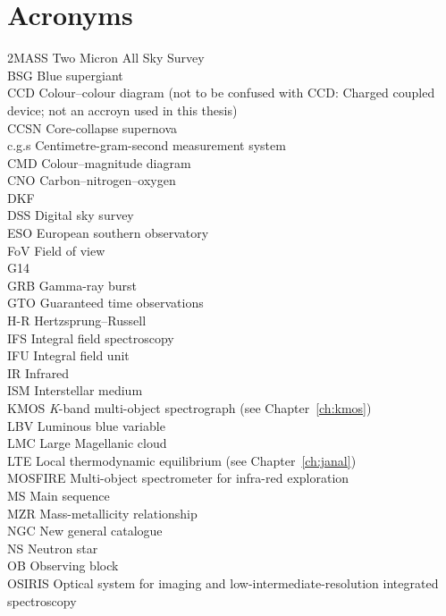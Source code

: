 \chapter{Acronyms}\label{ch:acc}

2MASS Two Micron All Sky Survey\\
BSG Blue supergiant\\
CCD Colour--colour diagram (not to be confused with CCD: Charged coupled device; not an accroyn used in this thesis)\\
CCSN Core-collapse supernova\\
c.g.s Centimetre-gram-second measurement system\\
CMD Colour--magnitude diagram\\
CNO Carbon--nitrogen--oxygen\\
DKF \citet{2010MNRAS.407.1203D}\\
DSS Digital sky survey\\
ESO European southern observatory\\
FoV Field of view\\
G14 \cite{2014PhDT.........G}\\
GRB Gamma-ray burst\\
GTO Guaranteed time observations\\
H-R Hertzsprung--Russell\\
IFS Integral field spectroscopy\\
IFU Integral field unit\\
IR Infrared\\
ISM Interstellar medium\\
KMOS {\it K}-band multi-object spectrograph (see Chapter~\ref{ch:kmos})\\
LBV Luminous blue variable\\
LMC Large Magellanic cloud\\
LTE Local thermodynamic equilibrium (see Chapter~\ref{ch:janal})\\
MOSFIRE Multi-object spectrometer for infra-red exploration\\
MS Main sequence\\
MZR Mass-metallicity relationship\\
NGC New general catalogue\\
NS Neutron star\\
OB Observing block\\
OSIRIS Optical system for imaging and low-intermediate-resolution integrated spectroscopy\\

